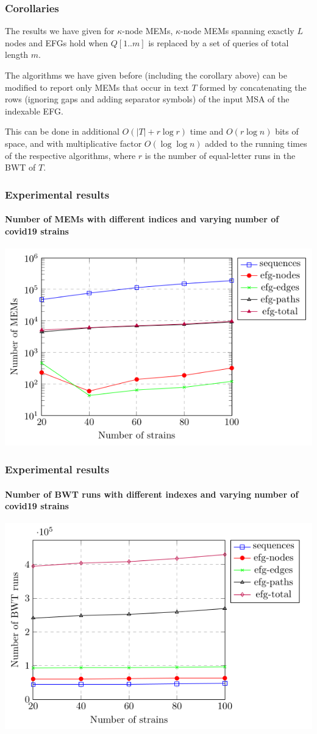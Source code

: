 \begin{frame}
	\frametitle{Corollaries}
	\begin{corollary}
		The results we have given for \(\kappa\)-node MEMs, \(\kappa\)-node MEMs spanning
		exactly \(L\) nodes and EFGs hold when \(Q[1..m]\) is replaced by a set of
		queries of total length \(m\).
	\end{corollary}
	\begin{corollary}
		The algorithms we have given before (including the corollary above) can be modified
		to report only MEMs that occur in text \(T\) formed by concatenating the rows (ignoring
		gaps and adding separator symbols) of the input MSA of the indexable EFG.
	\end{corollary}
	This can be done in additional \(O(|T | + r \log r)\) time and \(O(r \log n)\) bits of space,
	and with multiplicative factor \(O(\log \log n)\) added to the running times
	of the respective algorithms, where \(r\) is the number of equal-letter runs in the BWT of \(T\).
\end{frame}

\begin{frame}
	\frametitle{Experimental results}
	\framesubtitle{Number of MEMs with different indices and varying number of covid19 strains}
	\includegraphics[scale=0.5]{images/number-of-mems.png}
\end{frame}

\begin{frame}
	\frametitle{Experimental results}
	\framesubtitle{Number of BWT runs with different indexes and varying number of covid19 strains}
	\includegraphics[scale=0.5]{images/number-of-bwt-runs.png}
\end{frame}